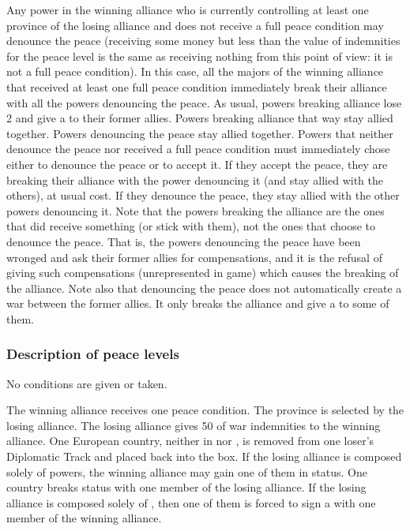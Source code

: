 \aparag[Disagreement] Any power in the winning alliance who is currently
controlling at least one province of the losing alliance and does not receive
a full peace condition may denounce the peace (receiving some money but less
than the value of indemnities for the peace level is the same as receiving
nothing from this point of view: it is not a full peace condition).
\bparag In this case, all the majors of the winning alliance that received at
least one full peace condition immediately break their alliance with all the
powers denouncing the peace.
\bparag As usual, powers breaking alliance lose 2 \STAB and give a \CB to
their former allies.
\bparag Powers breaking alliance that way stay allied together. Powers
denouncing the peace stay allied together.
\bparag Powers that neither denounce the peace nor received a full peace
condition must immediately chose either to denounce the peace or to accept it.
\bparag If they accept the peace, they are breaking their alliance with the
power denouncing it (and stay allied with the others), at usual cost.
\bparag If they denounce the peace, they stay allied with the other powers
denouncing it.
\bparag Note that the powers breaking the alliance are the ones that did
receive something (or stick with them), not the ones that choose to denounce
the peace. That is, the powers denouncing the peace have been wronged and ask
their former allies for compensations, and it is the refusal of giving such
compensations (unrepresented in game) which causes the breaking of the
alliance.
\bparag Note also that denouncing the peace does not automatically create a
war between the former allies. It only breaks the alliance and give a \CB to
some of them.

\subsubsection{Description of peace levels}
 No conditions are given or taken.

 The winning alliance receives one peace condition.
 The province is selected by the losing
alliance.
\bparag[Indemnities] The losing alliance gives 50 \ducats of war indemnities
to the winning alliance.
 One European country, neither in
\VASSAL nor \ANNEXION, is removed from one loser's Diplomatic Track and placed
back into the \Neutral box. If the losing alliance is composed solely of \MIN
powers, the winning alliance may gain one of them in \MR status.
 One \ROTW country breaks \dipFR status
with one member of the losing alliance. If the losing alliance is composed
solely of \MIN, then one of them is forced to sign a \dipFR with one member of
the winning alliance.

